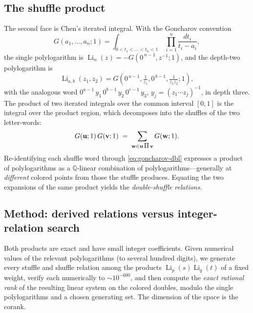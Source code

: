 \documentclass[11pt]{article}
\DeclareMathOperator{\Li}{Li}
\newcommand{\shuffle}{\mathbin{\rotatebox[origin=c]{180}{\ensuremath{\amalg}}}}
\theoremstyle{plain}
\theoremstyle{remark}
\begin{document}
\subsection{The shuffle product}

The second face is Chen's iterated integral. With the Goncharov convention
\begin{equation}\label{eq:G-def}
  G(a_1,\dots,a_n;1)=\int_{0<t_1<\dots<t_n<1}\ \prod_{i=1}^{n}\frac{dt_i}{t_i-a_i},
\end{equation}
the single polylogarithm is $\Li_n(z)=-G(0^{\,n-1},z^{-1};1)$, and the depth-two polylogarithm is
\begin{equation}\label{eq:goncharov-dbl}
  \Li_{a,b}(z_1,z_2)=G\!\left(0^{\,a-1},\tfrac1{z_1},0^{\,b-1},\tfrac1{z_1z_2};1\right),
\end{equation}
with the analogous word $0^{a-1}\,y_1\,0^{b-1}\,y_2\,0^{c-1}\,y_3$, $y_j=(z_1\cdots z_j)^{-1}$, in
depth three. The product of two iterated integrals over the common interval $[0,1]$ is the integral
over the product region, which decomposes into the shuffles of the two letter-words:
\begin{equation}\label{eq:shuffle}
  G(\mathbf u;1)\,G(\mathbf v;1)\;=\;\sum_{\mathbf w\in\mathbf u\,\shuffle\,\mathbf v}G(\mathbf w;1).
\end{equation}
Re-identifying each shuffle word through \eqref{eq:goncharov-dbl} expresses a product of polylogarithms
as a $\mathbb{Q}$-linear combination of polylogarithms---generally at \emph{different} colored points
from those the stuffle produces. Equating the two expansions of the same product yields the
\emph{double-shuffle relations}.

\subsection{Method: derived relations versus integer-relation search}\label{sec:method}

Both products are exact and have small integer coefficients. Given numerical values of the relevant
polylogarithms (to several hundred digits), we generate every stuffle and shuffle relation among the
products $\Li_p(s)\Li_q(t)$ of a fixed weight, verify each numerically to ${\sim}10^{-600}$, and then
compute the \emph{exact rational rank} of the resulting linear system on the colored doubles, modulo
the single polylogarithms and a chosen generating set. The dimension of the space is the corank.
\end{document}
